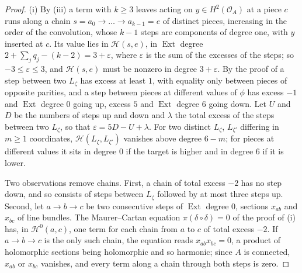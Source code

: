 \documentclass[11pt,reqno]{amsart}
\theoremstyle{plain}
\theoremstyle{definition}
\theoremstyle{remark}
\newcommand{\cO}{\mathcal{O}}
\newcommand{\cH}{\mathcal{H}}
\DeclareMathOperator{\Ext}{Ext}
\begin{document}
\begin{proof}
(i) By (iii) a term with $k\ge3$ leaves acting on
$y\in H^{2}(\cO_{A})$ at a piece $c$ runs along a chain
$s=a_{0}\to\dots\to a_{k-1}=e$ of distinct pieces, increasing in the order
of the convolution, whose $k-1$ steps are components of degree one, with $y$
inserted at $c$. Its value lies in $\cH(s,e)$, in $\Ext$ degree
$2+\sum_{j}q_{j}-(k-2)=3+\varepsilon$, where $\varepsilon$ is the sum of the
excesses of the steps; so $-3\le\varepsilon\le3$, and $\cH(s,e)$ must be
nonzero in degree $3+\varepsilon$. By the proof of 
a step between two $L_{\zeta}$ has excess at least $1$, with equality only
between pieces of opposite parities, and a step between pieces at different
values of $\phi$ has excess $-1$ and $\Ext$ degree $0$ going up, excess $5$
and $\Ext$ degree $6$ going down. Let $U$ and $D$ be the numbers of steps
up and down and $\lambda$ the total excess of the steps between two
$L_{\zeta}$, so that $\varepsilon=5D-U+\lambda$. For two distinct
$L_{\zeta}$, $L_{\zeta'}$ differing in $m\ge1$ coordinates, $\cH(L_{\zeta},
L_{\zeta'})$ vanishes above degree $6-m$; for pieces at different values it
sits in degree $0$ if the target is higher and in degree $6$ if it is lower.

Two observations remove chains. First, a chain of total excess $-2$ has no
step down, and so consists of steps between $L_{\zeta}$ followed by at most
three steps up. Second, let $a\to b\to c$ be two consecutive steps of
$\Ext$ degree $0$, sections $x_{ab}$ and $x_{bc}$ of line bundles. The
Maurer--Cartan equation $\pi(\delta\circ\delta)=0$ of the proof of
(i) has, in $\cH^{0}(a,c)$, one term for each
chain from $a$ to $c$ of total excess $-2$. If $a\to b\to c$ is the only such
chain, the equation reads $x_{ab}x_{bc}=0$, a product of holomorphic
sections being holomorphic and so harmonic; since $A$ is connected, $x_{ab}$
or $x_{bc}$ vanishes, and every term along a chain through both steps is
zero.


\end{proof}
\end{document}
